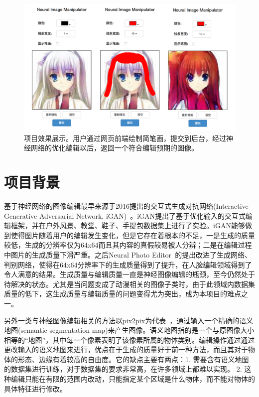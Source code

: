 \documentclass[a4paper,12pt,UTF8]{ctexart}
\newcommand{\kai}{\CJKfamily{zhkai}}	%
\begin{document}
\begin{figure}[H]
  \centering
  \includegraphics[width=0.9\linewidth]{figs/frontend.png}
  \caption{\kai 项目效果展示。用户通过网页前端绘制简笔画，提交到后台，经过神经网络的优化编辑以后，返回一个符合编辑预期的图像。}
  \label{fig:frontend}
\end{figure}


\section{项目背景}

基于神经网络的图像编辑最早来源于2016提出的交互式生成对抗网络(Interactive Generative Adversarial Network, iGAN)~\cite{Zhu2016Generative}。iGAN提出了基于优化输入的交互式编辑框架，并在户外风景、教堂、鞋子、手提包数据集上进行了实验。iGAN能够做到使得图片随着用户的编辑发生变化，但是它存在着根本的不足，一是生成的质量较低，生成的分辨率仅为64x64而且其内容的真假较易被人分辨；二是在编辑过程中图片的生成质量下滑严重。之后Neural Photo Editor~\cite{Brock2016Neural}的提出改进了生成网络、判别网络，使得在64x64分辨率下的生成质量得到了提升，在人脸编辑领域得到了令人满意的结果。生成质量与编辑质量一直是神经图像编辑的瓶颈，至今仍然处于待解决的状态。尤其是当问题变成了动漫相关的图像子类时，由于此领域内数据集质量的低下，这生成质量与编辑质量的问题变得尤为突出，成为本项目的难点之一。

另外一类与神经图像编辑相关的方法以pix2pix为代表~\cite{isola2016image}，通过输入一个精确的语义地图(semantic segmentation map)来产生图像。语义地图指的是一个与原图像大小相等的“地图”，其中每一个像素表明了该像素所属的物体类别。编辑操作通过通过更改输入的语义地图来进行，优点在于生成的质量好于前一种方法，而且其对于物体的形态、边缘有着较高的自由度。它的缺点主要有两点：1. 需要含有语义地图的数据集进行训练，对于数据集的要求非常高，在许多领域上都难以实现。 2. 这种编辑只能在有限的范围内改动，只能指定某个区域是什么物体，而不能对物体的具体特征进行修改。
\end{document}
